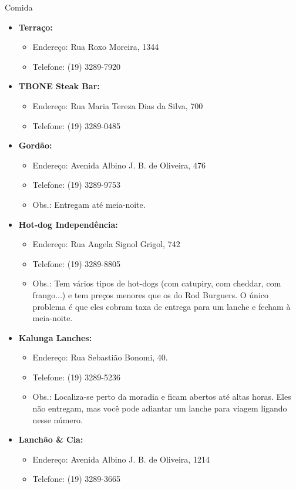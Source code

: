 \begin{story}{Comida}
\begin{itemize}
\item \textbf{Terraço:}
\begin{itemize}
\item Endereço: Rua Roxo Moreira, 1344
\item Telefone: (19) 3289-7920
\end{itemize}

\item \textbf{TBONE Steak Bar:}
\begin{itemize}
\item Endereço: Rua Maria Tereza Dias da Silva, 700
\item Telefone: (19) 3289-0485
\end{itemize}

\item \textbf{Gordão:}
\begin{itemize}
\item Endereço: Avenida Albino J. B. de Oliveira, 476
\item Telefone: (19) 3289-9753
\item Obs.: Entregam até meia-noite. 
\end{itemize}

\item \textbf{Hot-dog Independência:}
\begin{itemize}
\item Endereço: Rua Angela Signol Grigol, 742
\item Telefone: (19) 3289-8805
\item Obs.: Tem vários tipos de hot-dogs (com catupiry, com cheddar, com frango...) e tem preços menores que os do Rod Burguers. O único problema é que eles cobram taxa de entrega para um lanche e fecham à meia-noite.
\end{itemize}

\item \textbf{Kalunga Lanches:}
\begin{itemize}
\item Endereço: Rua Sebastião Bonomi, 40. 
\item Telefone: (19) 3289-5236
\item Obs.: Localiza-se perto da moradia e ficam abertos até altas horas. Eles não entregam, mas você pode adiantar um lanche para viagem ligando nesse número.
\end{itemize}

\item \textbf{Lanchão \& Cia:}
\begin{itemize}
\item Endereço: Avenida Albino J. B. de Oliveira, 1214
\item Telefone: (19) 3289-3665
\end{itemize}


\end{itemize}
\end{story}
